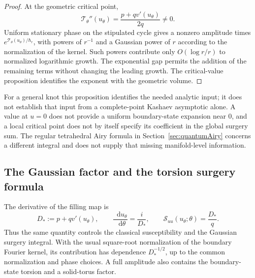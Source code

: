\documentclass[11pt,a4paper]{article}
\numberwithin{equation}{section}
\theoremstyle{definition}
\theoremstyle{remark}
\newcommand{\dd}{\mathop{}\!\mathrm d}
\begin{document}
\begin{proof}
At the geometric critical point,
\[
 \mathcal T_\theta''(u_\theta)
   =\frac{p+qv'(u_\theta)}{2q}\ne0.
\]
Uniform stationary phase on the stipulated cycle gives a nonzero
amplitude times $e^{\mathcal T_\theta(u_\theta)/\hbar_r}$,
with powers of $r^{-1}$ and a Gaussian power of $r$ according
to the normalization of the kernel. Such powers contribute only
$O(\log r/r)$ to normalized logarithmic growth. The exponential
gap permits the addition of the remaining terms without changing
the leading growth. The critical-value proposition identifies the
exponent with the geometric volume.
\end{proof}

For a general knot this proposition identifies the needed analytic
input; it does not establish that input from a complete-point
Kashaev asymptotic alone. A value at $u=0$ does not provide a
uniform boundary-state expansion near $0$, and a local critical
point does not by itself specify its coefficient in the global
surgery sum. The regular tetrahedral Airy formula in
Section~\ref{sec:quantumAiry} concerns a different integral and
does not supply that missing manifold-level information.

\subsection{The Gaussian factor and the torsion surgery formula}

The derivative of the filling map is
\begin{equation}
 D_*:=p+qv'(u_\theta),\qquad
 \frac{\dd u_\theta}{\dd\theta}=\frac{i}{D_*},\qquad
 \mathcal S_{uu}(u_\theta;\theta)=\frac{D_*}{q}.
 \label{eq:dehnjacobian}
\end{equation}
Thus the same quantity controls the classical susceptibility and
the Gaussian surgery integral. With the usual square-root
normalization of the boundary Fourier kernel, its contribution
has dependence $D_*^{-1/2}$, up to the common normalization and
phase choices. A full amplitude also contains the boundary-state
torsion and a solid-torus factor.
\end{document}
